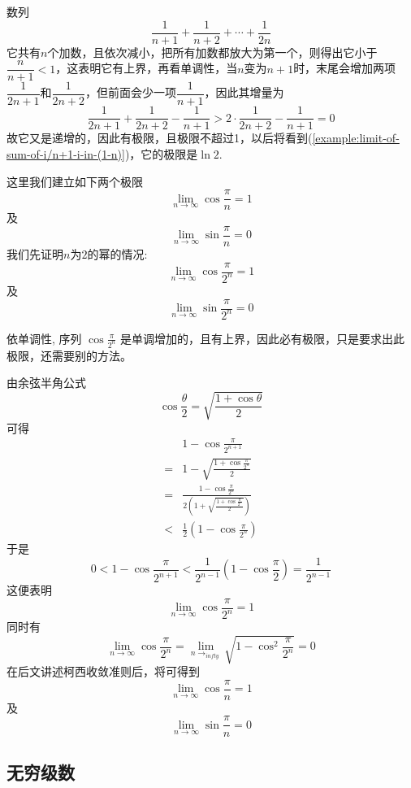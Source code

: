 \begin{example}
  数列
  \[ \frac{1}{n+1}+\frac{1}{n+2}+\cdots+\frac{1}{2n} \]
  它共有$n$个加数，且依次减小，把所有加数都放大为第一个，则得出它小于$\dfrac{n}{n+1}<1$，这表明它有上界，再看单调性，当$n$变为$n+1$时，末尾会增加两项$\dfrac{1}{2n+1}$和$\dfrac{1}{2n+2}$，但前面会少一项$\dfrac{1}{n+1}$，因此其增量为
  \[ \frac{1}{2n+1}+\frac{1}{2n+2}-\frac{1}{n+1} > 2 \cdot \frac{1}{2n+2} - \frac{1}{n+1} = 0 \]
  故它又是递增的，因此有极限，且极限不超过1，以后将看到(\autoref{example:limit-of-sum-of-i/n+1-i-in-(1-n)})，它的极限是$\ln{2}$.
\end{example}

\begin{example}
  \label{limit-of-cos-pi-frac-n}
  这里我们建立如下两个极限
  \[ \lim_{n\to\infty}\cos{\frac{\pi}{n}}=1 \]
  及
  \[ \lim_{n\to\infty}\sin{\frac{\pi}{n}}=0 \]
  我们先证明$n$为$2$的幂的情况:
  \[ \lim_{n\to\infty}\cos{\frac{\pi}{2^n}}=1 \]
  及
  \[ \lim_{n\to\infty}\sin{\frac{\pi}{2^n}}=0 \]

  依单调性, 序列 $\cos{\frac{\pi}{2^n}}$ 是单调增加的，且有上界，因此必有极限，只是要求出此极限，还需要别的方法。

  
  由余弦半角公式
  \[ \cos{\frac{\theta}{2}} = \sqrt{ \frac{1+\cos{\theta}}{2} } \]
  可得
  \begin{equation*}
    \begin{split}
        & 1-\cos{\frac{\pi}{2^{n+1}}} \\
        =& 1-\sqrt{\frac{1+\cos{\frac{\pi}{2^{n}}}}{2}} \\
      = & \frac{1-\cos{\frac{\pi}{2^{n}}}}{2 \left( 1+\sqrt{\frac{1+\cos{\frac{\pi}{2^{n}}}}{2}} \right)} \\
      < & \frac{1}{2} \left( 1-\cos{\frac{\pi}{2^{n}}} \right)
    \end{split}
  \end{equation*}
  于是
  \[ 0 < 1-\cos{\frac{\pi}{2^{n+1}}} < \frac{1}{2^{n-1}} \left( 1- \cos{\frac{\pi}{2}} \right) = \frac{1}{2^{n-1}} \]
  这便表明
  \[ \lim_{n\to\infty}\cos{\frac{\pi}{2^n}}=1 \]
  同时有
  \[ \lim_{n\to\infty}\cos{\frac{\pi}{2^n}} = \lim_{n\to_{infty}}\sqrt{1-\cos^2 \frac{\pi}{2^n} } = 0 \]
  在后文讲述柯西收敛准则后，将可得到
  \[ \lim_{n\to\infty}\cos{\frac{\pi}{n}}=1 \]
  及
  \[ \lim_{n\to\infty}\sin{\frac{\pi}{n}}=0 \]
\end{example}

\subsection{无穷级数}
\label{sec:infinite-series}

